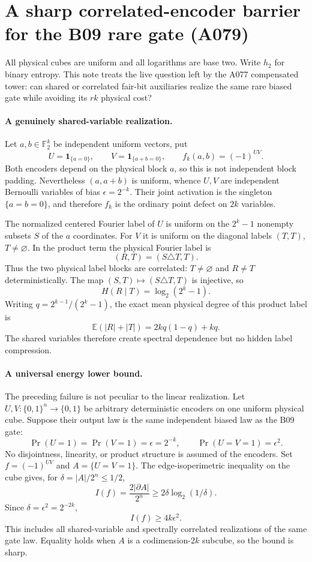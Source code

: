 \section*{A sharp correlated-encoder barrier for the B09 rare gate (A079)}

All physical cubes are uniform and all logarithms are base two.  Write
$h_2$ for binary entropy.  This note treats the live question left by the
A077 compensated tower: can shared or correlated fair-bit auxiliaries realize
the same rare biased gate while avoiding its $r k$ physical cost?

\paragraph{A genuinely shared-variable realization.}
Let $a,b\in\mathbb F_2^k$ be independent uniform vectors, put
\[
 U=\mathbf 1_{\{a=0\}},\qquad V=\mathbf 1_{\{a+b=0\}},\qquad
 f_k(a,b)=(-1)^{UV}.
\]
Both encoders depend on the physical block $a$, so this is not independent
block padding.  Nevertheless $(a,a+b)$ is uniform, whence $U,V$ are
independent Bernoulli variables of bias $\epsilon=2^{-k}$.  Their joint
activation is the singleton $\{a=b=0\}$, and therefore $f_k$ is the ordinary
point defect on $2k$ variables.

The normalized centered Fourier label of $U$ is uniform on the $2^k-1$
nonempty subsets $S$ of the $a$ coordinates.  For $V$ it is uniform on the
diagonal labels $(T,T)$, $T\ne\varnothing$.  In the product term the physical
Fourier label is
\[
 (R,T)=(S\triangle T,T).
\]
Thus the two physical label blocks are correlated: $T\ne\varnothing$ and
$R\ne T$ deterministically.  The map $(S,T)\mapsto(S\triangle T,T)$ is
injective, so
\[
 H(R\mid T)=\log_2(2^k-1).
\]
Writing $q=2^{k-1}/(2^k-1)$, the exact mean physical degree of this product
label is
\[
 \mathbb E(|R|+|T|)=2kq(1-q)+kq.
\]
The shared variables therefore create spectral dependence but no hidden
label compression.

\paragraph{A universal energy lower bound.}
The preceding failure is not peculiar to the linear realization.  Let
$U,V:\{0,1\}^n\to\{0,1\}$ be arbitrary deterministic encoders on one uniform
physical cube.  Suppose their output law is the same independent biased law
as the B09 gate:
\[
 \Pr(U=1)=\Pr(V=1)=\epsilon=2^{-k},\qquad
 \Pr(U=V=1)=\epsilon^2.
\]
No disjointness, linearity, or product structure is assumed of the encoders.
Set $f=(-1)^{UV}$ and $A=\{U=V=1\}$.  The edge-isoperimetric inequality on
the cube gives, for $\delta=|A|/2^n\le1/2$,
\[
 I(f)=\frac{2|\partial A|}{2^n}
 \ge 2\delta\log_2(1/\delta).
\]
Since $\delta=\epsilon^2=2^{-2k}$,
\begin{equation}\label{eq:energy}
 \boxed{I(f)\ge4k\epsilon^2.}
\end{equation}
This includes all shared-variable and spectrally correlated realizations of
the same gate law.  Equality holds when $A$ is a codimension-$2k$ subcube,
so the bound is sharp.

